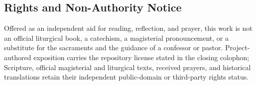 \subsection*{Rights and Non-Authority Notice}

Offered as an independent aid for reading, reflection, and prayer, this work is not an official liturgical book, a catechism, a magisterial pronouncement, or a substitute for the sacraments and the guidance of a confessor or pastor. Project-authored exposition carries the repository license stated in the closing colophon; Scripture, official magisterial and liturgical texts, received prayers, and historical translations retain their independent public-domain or third-party rights status.
